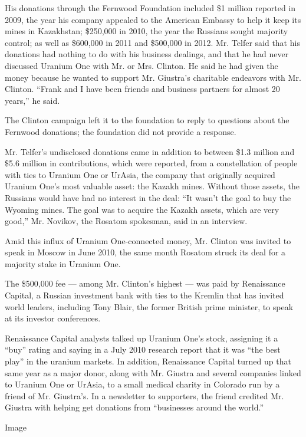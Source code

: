 His donations through the Fernwood Foundation included \$1 million
reported in 2009, the year his company appealed to the American Embassy
to help it keep its mines in Kazakhstan; \$250,000 in 2010, the year the
Russians sought majority control; as well as \$600,000 in 2011 and
\$500,000 in 2012. Mr. Telfer said that his donations had nothing to do
with his business dealings, and that he had never discussed Uranium One
with Mr. or Mrs. Clinton. He said he had given the money because he
wanted to support Mr. Giustra's charitable endeavors with Mr. Clinton.
``Frank and I have been friends and business partners for almost 20
years,'' he said.

The Clinton campaign left it to the foundation to reply to questions
about the Fernwood donations; the foundation did not provide a response.

Mr. Telfer's undisclosed donations came in addition to between \$1.3
million and \$5.6 million in contributions, which were reported, from a
constellation of people with ties to Uranium One or UrAsia, the company
that originally acquired Uranium One's most valuable asset: the Kazakh
mines. Without those assets, the Russians would have had no interest in
the deal: ``It wasn't the goal to buy the Wyoming mines. The goal was to
acquire the Kazakh assets, which are very good,'' Mr. Novikov, the
Rosatom spokesman, said in an interview.

Amid this influx of Uranium One-connected money, Mr. Clinton was invited
to speak in Moscow in June 2010, the same month Rosatom struck its deal
for a majority stake in Uranium One.

The \$500,000 fee --- among Mr. Clinton's highest --- was paid by
Renaissance Capital, a Russian investment bank with ties to the Kremlin
that has invited world leaders, including Tony Blair, the former British
prime minister, to speak at its investor conferences.

Renaissance Capital analysts talked up Uranium One's stock, assigning it
a ``buy'' rating and saying in a July 2010 research report that it was
``the best play'' in the uranium markets. In addition, Renaissance
Capital turned up that same year as a major donor, along with Mr.
Giustra and several companies linked to Uranium One or UrAsia, to a
small medical charity in Colorado run by a friend of Mr. Giustra's. In a
newsletter to supporters, the friend credited Mr. Giustra with helping
get donations from ``businesses around the world.''

Image

